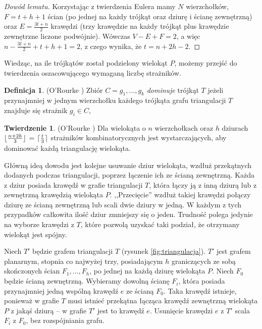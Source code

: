 \documentclass[brudnopis]{xmgr}
\DeclarePairedDelimiter\ceil{\lceil}{\rceil}
\DeclarePairedDelimiter\floor{\lfloor}{\rfloor}
\theoremstyle{definition}
\newtheorem{Twierdzenie}{Twierdzenie}
\newtheorem{Definicja}{Definicja}
\begin{document}
\begin{proof}[Dowód lematu]
	Korzystając z twierdzenia Eulera mamy $N$ wierzchołków, $F = t + h + 1$ ścian (po jednej na każdy trójkąt oraz dziurę i ścianę zewnętrzną) oraz $E = \frac{3t+n}{2}$ krawędzi (trzy krawędzie na każdy trójkąt plus krawędzie zewnętrzne liczone podwójnie).  Wówczas $V - E + F = 2$, a więc $n - \frac{3t+n}{2} + t + h + 1 = 2$, z czego wynika, że $t = n + 2h - 2$.
\end{proof}
Wiedząc, na ile trójkątów został podzielony wielokąt $P$, możemy przejść do twierdzenia oszacowującego wymaganą liczbę strażników.

\begin{Definicja} (O'Rourke \cite{orourke})
  Zbiór $C = {g_1,\ldots,g_k}$ \emph{dominuje} trójkąt $T$ jeżeli przynajmniej w jednym wierzchołku każdego trójkąta grafu triangulacji $T$ znajduje się strażnik $g_i \in C$,
\end{Definicja}

\begin{Twierdzenie} (O'Rourke \cite{orourke})
  Dla wielokąta o $n$ wierzchołkach oraz $h$ dziurach $\floor{\frac{n+2h}{3}}$ = $\ceil{\frac{t}{3}}$ strażników kombinatorycznych jest wystarczających, aby dominować każdą triangulację wielokąta.
\end{Twierdzenie}

\indent Główną ideą dowodu jest kolejne usuwanie dziur wielokąta, wzdłuż przekątnych dodanych podczas triangulacji, poprzez łączenie ich ze ścianą zewnętrzną. Każda z dziur posiada krawędź w grafie triangulacji $T$, która łączy ją z inną dziurą lub z zewnętrzną krawędzią wielokąta $P$. ,,Przecięcie'' wzdłuż takiej krawędzi połączy dziurę ze ścianą zewnętrzną lub scali dwie dziury w jedną. W każdym z tych przypadków całkowita ilość dziur zmniejszy się o jeden. Trudność polega jedynie na wyborze krawędzi z $T$, które pozwolą uzyskać taki podział, że otrzymany wielokąt jest spójny.

\indent Niech $T'$ będzie grafem triangulacji $T$ (rysunek \ref{fig:triangulacja}). $T'$ jest grafem planarnym, stopnia co najwyżej trzy, posiadającym $h$ graniczących ze sobą skończonych ścian $F_1, \ldots, F_h$, po jednej na każdą dziurę wielokąta $P$. Niech $F_0$ będzie ścianą zewnętrzną. Wybieramy dowolną ścianę $F_i$, która posiada przynajmniej jedną wspólną krawędź $e$ ze ścianą $F_0$. Taka krawędź istnieje, ponieważ w grafie $T$ musi istnieć przekątna łącząca krawędź zewnętrzną wielokąta $P$ z jakąś dziurą -- w grafie $T'$ jest to krawędź $e$. Usunięcie krawędzi $e$ z $T'$ scala $F_i$ z $F_0$, bez rozspójniania grafu.
\end{document}
